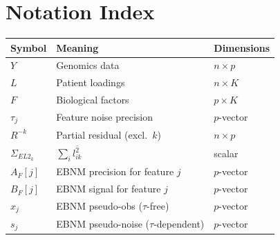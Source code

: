 \documentclass[11pt]{article}
\newcommand{\lsec}[2]{\overline{l^2_{#1#2}}}
\newcommand{\Rk}[0]{R^{-k}}
\begin{document}
\appendix
\section{Notation Index}

\begin{tabular}{lll}
\toprule
Symbol & Meaning & Dimensions \\
\midrule
$Y$ & Genomics data & $n \times p$ \\
$L$ & Patient loadings & $n \times K$ \\
$F$ & Biological factors & $p \times K$ \\
$\tau_j$ & Feature noise precision & $p$-vector \\
$\Rk$ & Partial residual (excl.\ $k$) & $n \times p$ \\
$\Sigma_{EL2_k}$ & $\sum_i\lsec{i}{k}$ & scalar \\
$A_F[j]$ & EBNM precision for feature $j$ & $p$-vector \\
$B_F[j]$ & EBNM signal for feature $j$ & $p$-vector \\
$x_j$ & EBNM pseudo-obs ($\tau$-free) & $p$-vector \\
$s_j$ & EBNM pseudo-noise ($\tau$-dependent) & $p$-vector \\
\bottomrule
\end{tabular}
\end{document}
